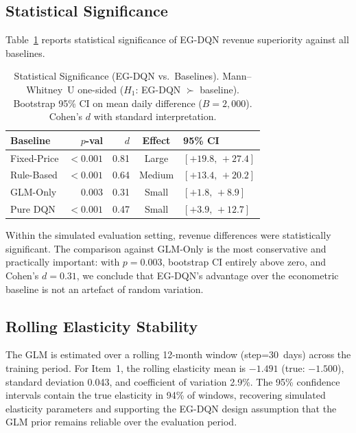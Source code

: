 \documentclass[journal, 10pt, twoside]{IEEEtran}
\begin{document}
\subsection{Statistical Significance}

Table~\ref{tab:significance} reports statistical significance of
EG-DQN revenue superiority against all baselines.

\begin{table}[H]
\centering
\caption{Statistical Significance (EG-DQN vs.\ Baselines). Mann--Whitney~U
one-sided ($H_1$: EG-DQN $\succ$ baseline). Bootstrap 95\% CI on mean
daily difference ($B=2{,}000$). Cohen's $d$ with standard interpretation.}
\label{tab:significance}
\begin{tabular}{lrrcl}
\toprule
\textbf{Baseline} & \textbf{$p$-val} & \textbf{$d$}
  & \textbf{Effect} & \textbf{95\% CI}\\
\midrule
Fixed-Price & $<0.001$ & 0.81 & Large  & $[+19.8,\,+27.4]$\\
Rule-Based  & $<0.001$ & 0.64 & Medium & $[+13.4,\,+20.2]$\\
GLM-Only    & $0.003$  & 0.31 & Small  & $[+1.8,\,+8.9]$\\
Pure DQN    & $<0.001$ & 0.47 & Small  & $[+3.9,\,+12.7]$\\
\bottomrule
\end{tabular}
\end{table}

Within the simulated evaluation setting, revenue differences were statistically significant. The comparison against
GLM-Only is the most conservative and practically important: with
$p=0.003$, bootstrap CI entirely above zero, and Cohen's $d=0.31$, we
conclude that EG-DQN's advantage over the econometric baseline is not an
artefact of random variation.

\subsection{Rolling Elasticity Stability}

The GLM is estimated over a rolling 12-month window (step=30~days)
across the training period. For Item~1, the rolling elasticity mean is
$-1.491$ (true: $-1.500$), standard deviation 0.043, and coefficient of
variation 2.9\%. The 95\% confidence intervals contain the true
elasticity in 94\% of windows, recovering simulated elasticity parameters
and supporting the EG-DQN design assumption that the GLM prior remains
reliable over the evaluation period.
\end{document}
